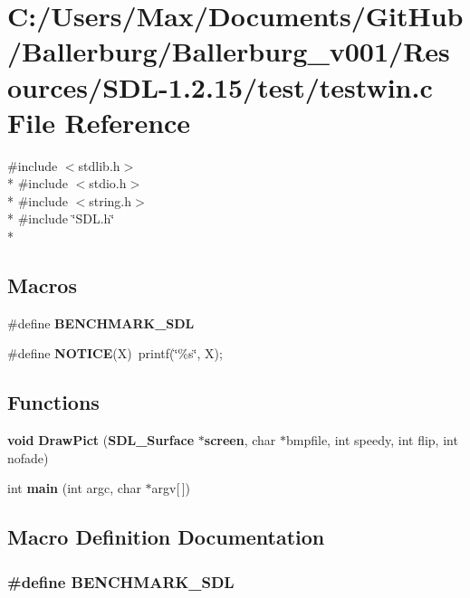 \section{C\+:/\+Users/\+Max/\+Documents/\+Git\+Hub/\+Ballerburg/\+Ballerburg\+\_\+v001/\+Resources/\+S\+D\+L-\/1.2.15/test/testwin.c File Reference}
\label{testwin_8c}
{\ttfamily \#include $<$stdlib.\+h$>$}\\*
{\ttfamily \#include $<$stdio.\+h$>$}\\*
{\ttfamily \#include $<$string.\+h$>$}\\*
{\ttfamily \#include \char`\"{}S\+D\+L.\+h\char`\"{}}\\*
\subsection*{Macros}
\begin{DoxyCompactItemize}
\item 
\#define {\bf B\+E\+N\+C\+H\+M\+A\+R\+K\+\_\+\+S\+D\+L}
\item 
\#define {\bf N\+O\+T\+I\+C\+E}(X)~printf(\char`\"{}\%s\char`\"{}, X);
\end{DoxyCompactItemize}
\subsection*{Functions}
\begin{DoxyCompactItemize}
\item 
{\bf void} {\bf Draw\+Pict} ({\bf S\+D\+L\+\_\+\+Surface} $\ast${\bf screen}, char $\ast$bmpfile, int speedy, int flip, int nofade)
\item 
int {\bf main} (int argc, char $\ast$argv[$\,$])
\end{DoxyCompactItemize}


\subsection{Macro Definition Documentation}
\subsubsection[{B\+E\+N\+C\+H\+M\+A\+R\+K\+\_\+\+S\+D\+L}]{\setlength{\rightskip}{0pt plus 5cm}\#define B\+E\+N\+C\+H\+M\+A\+R\+K\+\_\+\+S\+D\+L}\label{testwin_8c_a594d2affa2762af61d11b6f43c257ab8}
